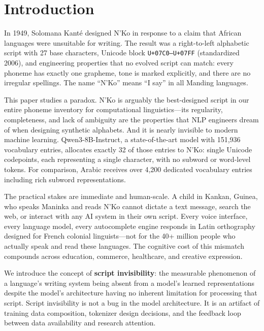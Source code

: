 \documentclass[11pt]{article}
\begin{document}
\section{Introduction}

In 1949, Solomana Kant\'{e} designed N'Ko in response to a claim that African languages were unsuitable for writing.
The result was a right-to-left alphabetic script with 27 base characters, Unicode block \texttt{U+07C0--U+07FF} (standardized 2006), and engineering properties that no evolved script can match: every phoneme has exactly one grapheme, tone is marked explicitly, and there are no irregular spellings.
The name ``N'Ko'' means ``I say'' in all Manding languages.

This paper studies a paradox.
N'Ko is arguably the best-designed script in our entire phoneme inventory for computational linguistics---its regularity, completeness, and lack of ambiguity are the properties that NLP engineers dream of when designing synthetic alphabets.
And it is nearly invisible to modern machine learning.
Qwen3-8B-Instruct, a state-of-the-art model with 151,936 vocabulary entries, allocates exactly 32 of those entries to N'Ko: single Unicode codepoints, each representing a single character, with no subword or word-level tokens.
For comparison, Arabic receives over 4,200 dedicated vocabulary entries including rich subword representations.

The practical stakes are immediate and human-scale.
A child in Kankan, Guinea, who speaks Maninka and reads N'Ko cannot dictate a text message, search the web, or interact with any AI system in their own script.
Every voice interface, every language model, every autocomplete engine responds in Latin orthography designed for French colonial linguists---not for the 40+ million people who actually speak and read these languages.
The cognitive cost of this mismatch compounds across education, commerce, healthcare, and creative expression.

We introduce the concept of \textbf{script invisibility}: the measurable phenomenon of a language's writing system being absent from a model's learned representations despite the model's architecture having no inherent limitation for processing that script.
Script invisibility is not a bug in the model architecture.
It is an artifact of training data composition, tokenizer design decisions, and the feedback loop between data availability and research attention.
\end{document}
